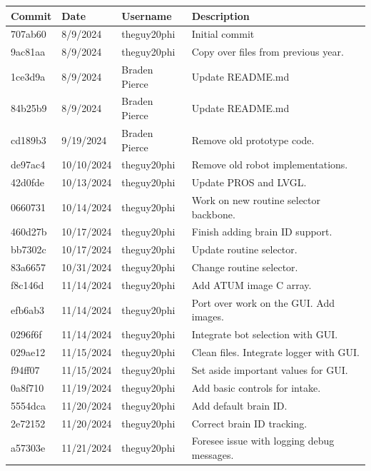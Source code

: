 \begin{center}
\begin{longtable}{|p{28pt}|p{33pt}|p{40pt}|p{300pt}|}
\hline
\textbf{Commit} & \textbf{Date} & \textbf{Username} & \textbf{Description} \\
\hline
707ab60 & 8/9/2024 & theguy20phi & Initial commit \\
\hline
9ac81aa & 8/9/2024 & theguy20phi & Copy over files from previous year. \\
\hline
1ce3d9a & 8/9/2024 & Braden Pierce & Update README.md \\
\hline
84b25b9 & 8/9/2024 & Braden Pierce & Update README.md \\
\hline
cd189b3 & 9/19/2024 & Braden Pierce & Remove old prototype code. \\
\hline
de97ac4 & 10/10/2024 & theguy20phi & Remove old robot implementations. \\
\hline
42d0fde & 10/13/2024 & theguy20phi & Update PROS and LVGL. \\
\hline
0660731 & 10/14/2024 & theguy20phi & Work on new routine selector backbone. \\
\hline
460d27b & 10/17/2024 & theguy20phi & Finish adding brain ID support. \\
\hline
bb7302c & 10/17/2024 & theguy20phi & Update routine selector. \\
\hline
83a6657 & 10/31/2024 & theguy20phi & Change routine selector. \\
\hline
f8c146d & 11/14/2024 & theguy20phi & Add ATUM image C array. \\
\hline
efb6ab3 & 11/14/2024 & theguy20phi & Port over work on the GUI. Add images. \\
\hline
0296f6f & 11/14/2024 & theguy20phi & Integrate bot selection with GUI. \\
\hline
029ae12 & 11/15/2024 & theguy20phi & Clean files. Integrate logger with GUI. \\
\hline
f94ff07 & 11/15/2024 & theguy20phi & Set aside important values for GUI. \\
\hline
0a8f710 & 11/19/2024 & theguy20phi & Add basic controls for intake. \\
\hline
5554dca & 11/20/2024 & theguy20phi & Add default brain ID. \\
\hline
2e72152 & 11/20/2024 & theguy20phi & Correct brain ID tracking. \\
\hline
a57303e & 11/21/2024 & theguy20phi & Foresee issue with logging debug messages. \\
\hline

\end{longtable}
\end{center}

